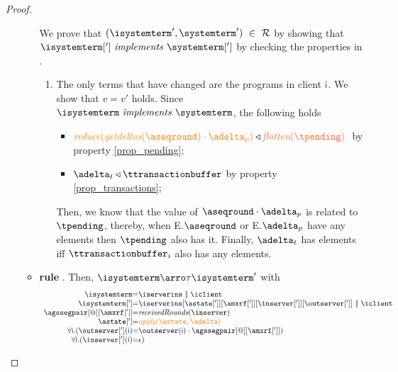 \begin{proof}
\begin{itemize}
\begin{itemize}
				We  prove that $(\isystemterm',\systemterm') \ \in \ \mathcal{R}$ by showing that $\implements{\isystemterm[']}{\systemterm[']}$ 
				by checking the properties in .			
					\begin{enumerate}
						\item The only terms that have changed are the programs in client $\textcolor{blue}{{\sf i}}$.  We show that $v=v'$ holds. Since 
						$\implements{\isystemterm}{\systemterm}$, the following holds
						\begin{itemize}
							\item $\ireduce{\igetdeltas{\pending}\cdot{\pushbuffer}}\triangleleft \flatten{\tpending} \ $ by property \ref{prop_pending};
							\item $\transactionbuffer \triangleleft{\ttransactionbuffer}$ by property \ref{prop_transactions};
						\end{itemize}
						Then, we know that the value of $\pending \cdot \pushbuffer$ is related to $\tpending$, thereby, when E.$\pending$ or E.$\pushbuffer$ have any elements then $\tpending$ also has it. Finally, $\transactionbuffer$ has elements iff $\ttransactionbuffer_i$ also has any elements.
			
					\end{enumerate}
	
	
	
	
	
	\item {\bf rule }. Then, $\isystemterm  \arroi{\tau} \isystemterm '$ with 
				\[\begin{array}{r@{=}l}
					\isystemterm & \iserverins\ \bigpar \ \iclient
					\\
					\isystemterm['] & {\iserverins[{\astate[']}][{\amxrf[{'}]}][{\inserver[']}][{\outserver[']}]}\ \bigpar \ \iclient \\
					\agssegpair[@][{\amxrf[{'}]}] &\receiveroundsname{\inserver} \\ %
					\astate[']&\iapply{\astate}{\adelta} \\
					\forall\cid.(\outserver['] (\cid)& \outserver(\cid)\cdot\agssegpair[@][{\amxrf[{'}]}]) \\
					\forall\cid.(\inserver['](\cid) & \epsilon)
				  \end{array}
				\]
		

\end{itemize}
\end{itemize}
\end{proof}
